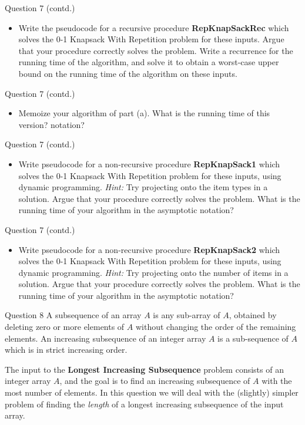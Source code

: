 \documentclass{beamer}
\begin{document}
\begin{frame}{Question 7 (contd.)}
\begin{itemize}
  \item[(a)] Write the pseudocode for a recursive procedure \textbf{RepKnapSackRec} which solves the 0-1 Knapsack With Repetition problem for these inputs. Argue that your procedure correctly solves the problem. Write a recurrence for the running time of the algorithm, and solve it to obtain a worst-case upper bound on the running time of the algorithm on these inputs.
\end{itemize}
\end{frame}

\begin{frame}{Question 7 (contd.)}
\begin{itemize}
  \item[(b)] Memoize your algorithm of part (a). What is the running time of this version?
 notation?
\end{itemize}
\end{frame}

\begin{frame}{Question 7 (contd.)}
\begin{itemize}
   \item[(c)] Write pseudocode for a non-recursive procedure \textbf{RepKnapSack1} which solves the 0-1 Knapsack With Repetition problem for these inputs, using dynamic programming. \textit{Hint:} Try projecting onto the item types in a solution. Argue that your procedure correctly solves the problem. What is the running time of your algorithm in the asymptotic notation?
\end{itemize}
\end{frame}

\begin{frame}{Question 7 (contd.)}
\begin{itemize}
  \item[(d)] Write pseudocode for a non-recursive procedure \textbf{RepKnapSack2} which solves the 0-1 Knapsack With Repetition problem for these inputs, using dynamic programming. \textit{Hint:} Try projecting onto the number of items in a solution. Argue that your procedure correctly solves the problem. What is the running time of your algorithm in the asymptotic notation?
\end{itemize}
\end{frame}


\begin{frame}{Question 8}
A subsequence of an array $A$ is any sub-array of $A$, obtained by deleting zero or more elements of $A$ without changing the order of the remaining elements. An increasing subsequence of an integer array $A$ is a sub-sequence of $A$ which is in strict increasing order.

\medskip
The input to the \textbf{Longest Increasing Subsequence} problem consists of an integer array $A$, and the goal is to find an increasing subsequence of $A$ with the most number of elements. In this question we will deal with the (slightly) simpler problem of finding the \emph{length} of a longest increasing subsequence of the input array.
\end{frame}
\end{document}
